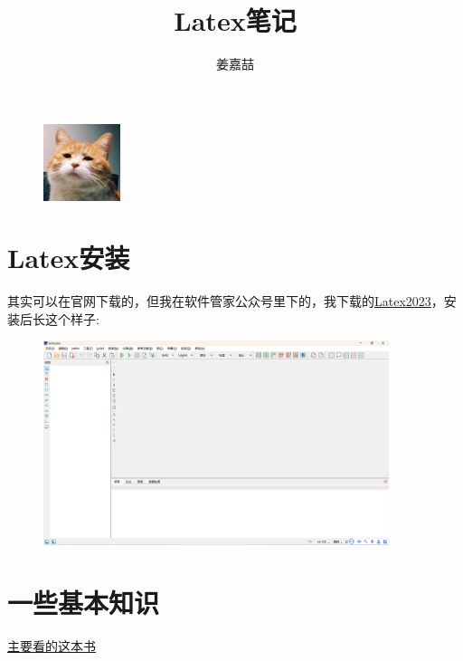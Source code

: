 \documentclass{article}
\title{Latex笔记}
\author{姜嘉喆}
\date{\zhtoday}
\begin{document}
	
\maketitle

\graphicspath{{image}}
\begin{figure}[!htb]
\centering
\includegraphics[width=0.2\textwidth]{cat.png}
\end{figure}

\section{Latex安装}
其实可以在官网下载的，但我在软件管家公众号里下的，我下载的\href{https://mp.weixin.qq.com/s/PKXbMBmP8ounwbQE1OiRpw}{Latex2023}，安装后长这个样子:
\begin{figure}[!htb]
\centering
\includegraphics[width=0.9\textwidth]{image/Latex2023.png}
\end{figure}


\section{一些基本知识}
\href{https://mirrors.tuna.tsinghua.edu.cn/CTAN/info/lshort/chinese/lshort-zh-cn.pdf}{主要看的这本书}
\end{document}
